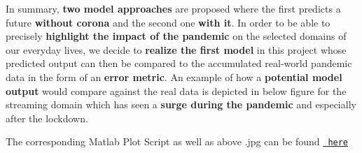 In summary, {\bfseries{two model approaches}} are proposed where the first predicts a future {\bfseries{without corona}} and the second one {\bfseries{with it}}. In order to be able to precisely {\bfseries{highlight the impact of the pandemic}} on the selected domains of our everyday lives, we decide to {\bfseries{realize the first model}} in this project whose predicted output can then be compared to the accumulated real-\/world pandemic data in the form of an {\bfseries{error metric}}. An example of how a {\bfseries{potential model output}} would compare against the real data is depicted in below figure for the streaming domain which has seen a {\bfseries{surge during the pandemic}} and especially after the lockdown.



The corresponding Matlab Plot Script as well as above .jpg can be found \href{/documentation/Matlab Plots/ML Strategy}{\texttt{ here}} 